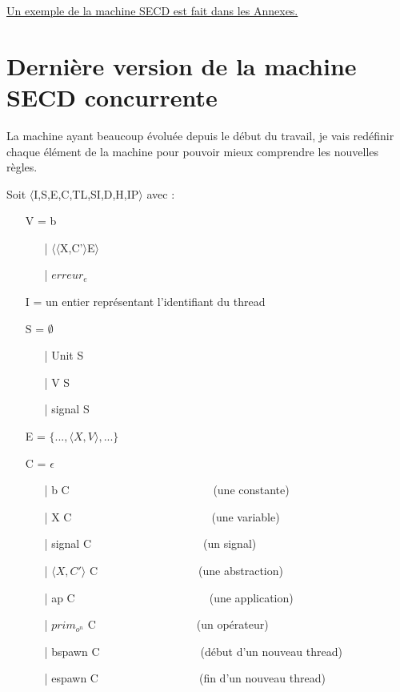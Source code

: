 \documentclass[10pt,a4paper]{article}
\begin{document}
					
					\hyperref[SECD]{Un exemple de la machine SECD est fait dans les Annexes.}
					
					\newpage
		\section{Dernière version de la machine SECD concurrente}\label{SECDConc4}
			La machine ayant beaucoup évoluée depuis le début du travail, je vais redéfinir chaque élément de la machine pour pouvoir mieux comprendre les nouvelles règles.
			\bigbreak
			
			Soit $\langle$I,S,E,C,TL,SI,D,H,IP$\rangle$ avec :
			
			\begin{itemize}
				\item[] V = b	
				\begin{itemize}
					\item[|] $\langle\langle$X,C'$\rangle$E$\rangle$
					\item[|] $erreur_{e}$
				\end{itemize}
				\item[]
				\item[] I = un entier représentant l'identifiant du thread
				\item[] S =  $\emptyset$ 
				\begin{itemize}
					\item[|] Unit S
					\item[|] V S
					\item[|] signal S
				\end{itemize}
				\item[] E = $\{...,\langle X,V\rangle,...\}$
				\item[] C = $\epsilon$
				\begin{itemize}
					\item[|] b C     ~~~~~~~~~~~~~~~~~~~~~~~~~(une constante)
					\item[|] X C~~~~~~~~~~~~~~~~~~~~~~~~~(une variable)
					\item[|] signal C~~~~~~~~~~~~~~~~~~~~(un signal)
					\item[|]$\langle X,C'\rangle$ C~~~~~~~~~~~~~~~~~~(une abstraction)
					\item[|] ap C~~~~~~~~~~~~~~~~~~~~~~~~(une application)
					\item[|] $prim_{o^{n}}$ C~~~~~~~~~~~~~~~~~~(un opérateur)
					\item[|] bspawn C~~~~~~~~~~~~~~~~~~(début d'un nouveau thread)
					\item[|] espawn C~~~~~~~~~~~~~~~~~~(fin d'un nouveau thread)

\end{itemize}
\end{itemize}
\end{document}
